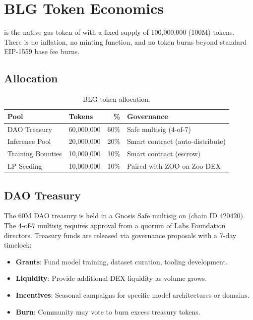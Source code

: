 \section{BLG Token Economics}
\label{sec:token}

\BLG{} is the native gas token of \Beluga{} with a fixed supply of 100,000,000 (100M) tokens. There is no inflation, no minting function, and no token burns beyond standard EIP-1559 base fee burns.

\subsection{Allocation}

\begin{table}[h]
\centering
\caption{BLG token allocation.}
\label{tab:allocation}
\begin{tabular}{@{}llrl@{}}
\toprule
Pool & Tokens & \% & Governance \\
\midrule
DAO Treasury & 60,000,000 & 60\% & Safe multisig (4-of-7) \\
Inference Pool & 20,000,000 & 20\% & Smart contract (auto-distribute) \\
Training Bounties & 10,000,000 & 10\% & Smart contract (escrow) \\
LP Seeding & 10,000,000 & 10\% & Paired with ZOO on Zoo DEX \\
\bottomrule
\end{tabular}
\end{table}

\subsection{DAO Treasury}

The 60M \BLG{} DAO treasury is held in a Gnosis Safe multisig on \Beluga{} (chain ID 420420). The 4-of-7 multisig requires approval from a quorum of \Zoo{} Labs Foundation directors. Treasury funds are released via governance proposals with a 7-day timelock:

\begin{itemize}[nosep]
    \item \textbf{Grants}: Fund model training, dataset curation, tooling development.
    \item \textbf{Liquidity}: Provide additional DEX liquidity as volume grows.
    \item \textbf{Incentives}: Seasonal campaigns for specific model architectures or domains.
    \item \textbf{Burn}: Community may vote to burn excess treasury tokens.
\end{itemize}

